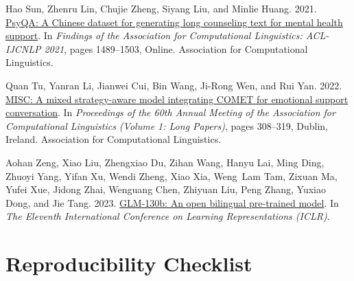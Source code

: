 \documentclass[11pt]{article}
\begin{document}
\begin{thebibliography}{20}
Hao Sun, Zhenru Lin, Chujie Zheng, Siyang Liu, and Minlie Huang. 2021.
\newblock \href {https://doi.org/10.18653/v1/2021.findings-acl.130} {{P}sy{QA}: A {C}hinese dataset for generating long counseling text for mental health support}.
\newblock In \emph{Findings of the Association for Computational Linguistics: ACL-IJCNLP 2021}, pages 1489--1503, Online. Association for Computational Linguistics.

Quan Tu, Yanran Li, Jianwei Cui, Bin Wang, Ji-Rong Wen, and Rui Yan. 2022.
\newblock \href {https://doi.org/10.18653/v1/2022.acl-long.25} {{MISC}: A mixed strategy-aware model integrating {COMET} for emotional support conversation}.
\newblock In \emph{Proceedings of the 60th Annual Meeting of the Association for Computational Linguistics (Volume 1: Long Papers)}, pages 308--319, Dublin, Ireland. Association for Computational Linguistics.

Aohan Zeng, Xiao Liu, Zhengxiao Du, Zihan Wang, Hanyu Lai, Ming Ding, Zhuoyi Yang, Yifan Xu, Wendi Zheng, Xiao Xia, Weng~Lam Tam, Zixuan Ma, Yufei Xue, Jidong Zhai, Wenguang Chen, Zhiyuan Liu, Peng Zhang, Yuxiao Dong, and Jie Tang. 2023.
\newblock \href {https://openreview.net/forum?id=-Aw0rrrPUF} {{GLM}-130b: An open bilingual pre-trained model}.
\newblock In \emph{The Eleventh International Conference on Learning Representations (ICLR)}.

\end{thebibliography}

\appendix

\section{Reproducibility Checklist}
\label{sec:appendix_reproducibility}
\end{document}
